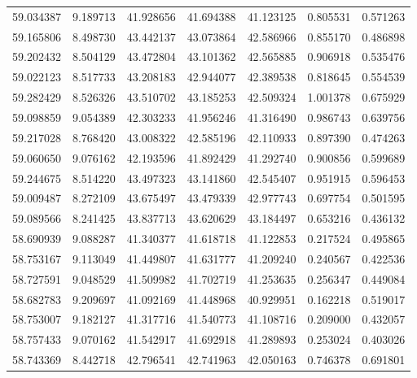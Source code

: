 \begin{tabular}{rrrrrrr}
 59.034387 &   9.189713 &         41.928656 &         41.694388 &         41.123125 &  0.805531 &  0.571263 \\
 59.165806 &   8.498730 &         43.442137 &         43.073864 &         42.586966 &  0.855170 &  0.486898 \\
 59.202432 &   8.504129 &         43.472804 &         43.101362 &         42.565885 &  0.906918 &  0.535476 \\
 59.022123 &   8.517733 &         43.208183 &         42.944077 &         42.389538 &  0.818645 &  0.554539 \\
 59.282429 &   8.526326 &         43.510702 &         43.185253 &         42.509324 &  1.001378 &  0.675929 \\
 59.098859 &   9.054389 &         42.303233 &         41.956246 &         41.316490 &  0.986743 &  0.639756 \\
 59.217028 &   8.768420 &         43.008322 &         42.585196 &         42.110933 &  0.897390 &  0.474263 \\
 59.060650 &   9.076162 &         42.193596 &         41.892429 &         41.292740 &  0.900856 &  0.599689 \\
 59.244675 &   8.514220 &         43.497323 &         43.141860 &         42.545407 &  0.951915 &  0.596453 \\
 59.009487 &   8.272109 &         43.675497 &         43.479339 &         42.977743 &  0.697754 &  0.501595 \\
 59.089566 &   8.241425 &         43.837713 &         43.620629 &         43.184497 &  0.653216 &  0.436132 \\
 58.690939 &   9.088287 &         41.340377 &         41.618718 &         41.122853 &  0.217524 &  0.495865 \\
 58.753167 &   9.113049 &         41.449807 &         41.631777 &         41.209240 &  0.240567 &  0.422536 \\
 58.727591 &   9.048529 &         41.509982 &         41.702719 &         41.253635 &  0.256347 &  0.449084 \\
 58.682783 &   9.209697 &         41.092169 &         41.448968 &         40.929951 &  0.162218 &  0.519017 \\
 58.753007 &   9.182127 &         41.317716 &         41.540773 &         41.108716 &  0.209000 &  0.432057 \\
 58.757433 &   9.070162 &         41.542917 &         41.692918 &         41.289893 &  0.253024 &  0.403026 \\
 58.743369 &   8.442718 &         42.796541 &         42.741963 &         42.050163 &  0.746378 &  0.691801 \\

\end{tabular}
